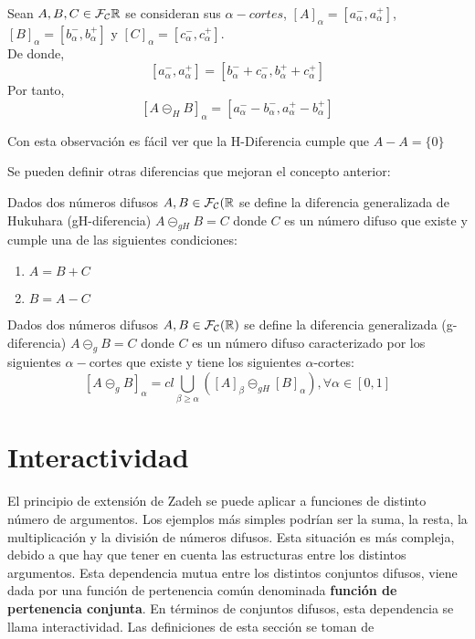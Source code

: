   \begin{observacion}
    Sean $A, B, C \in \mathcal{F}_\mathcal{C}\mathbb R$ se consideran sus $\alpha - cortes$, $[A]_\alpha = [a^-_\alpha, a^+_\alpha]$, $[B]_\alpha = [b^-_\alpha, b^+_\alpha]$ y $[C]_\alpha = [c^-_\alpha, c^+_\alpha]$. \\
    De donde,
    $$
    [a^-_\alpha, a^+_\alpha] = [b^-_\alpha + c^-_\alpha, b^+_\alpha + c^+_\alpha]
    $$
    Por tanto, 
    $$
    [A \circleddash_H B]_\alpha = [a_\alpha^- - b_\alpha^-, a_\alpha^+ - b_\alpha^+]
    $$
  \end{observacion}
  Con esta observación es fácil ver que la H-Diferencia cumple que $A-A=\{0\}$
 
  Se pueden definir otras diferencias que mejoran el concepto anterior:
  
  \begin{definicion}
  	Dados dos números difusos $A, B \in \mathcal{F}_\mathcal{C}(\mathbb R$ se define la diferencia generalizada de Hukuhara (gH-diferencia) $A\circleddash_{gH}B=C$ donde $C$ es un número difuso que existe y cumple una de las siguientes condiciones:
  	
  	\begin{enumerate}
  		\item $A=B+C$ 
  		\item $B=A-C$
  	\end{enumerate}
  \end{definicion}

  \begin{definicion}
	Dados dos números difusos $A, B \in \mathcal{F}_\mathcal{C}(\mathbb R)$ se define la diferencia generalizada (g-diferencia) $A\circleddash_{g}B=C$ donde $C$ es un número difuso caracterizado por los siguientes $\alpha-$cortes que existe y tiene los siguientes $\alpha$-cortes:
	\[
		[A \circleddash_{g} B]_\alpha = cl \bigcup_{\beta \geq \alpha} ([A]_\beta \circleddash_{gH} [B]_\alpha), \forall \alpha \in [0, 1]
	\]
  \end{definicion}

  \section{Interactividad}
  El principio de extensión de Zadeh se puede aplicar a funciones de distinto número de argumentos. Los ejemplos más simples podrían ser la suma, la resta, la multiplicación y la división de números difusos. Esta situación es más compleja, debido a que hay que tener en cuenta las estructuras entre los distintos argumentos. Esta dependencia mutua entre los distintos conjuntos difusos, viene dada por una función de pertenencia común denominada \textbf{función de pertenencia conjunta}. En términos de conjuntos difusos, esta dependencia se llama interactividad. Las definiciones de esta sección se toman de \cite{fuzzyeqn}

